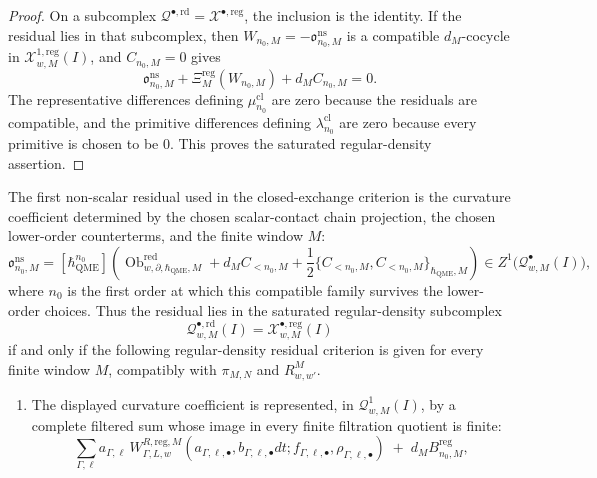 \begin{proof}
  On a subcomplex
  \(\mathcal Q^{\bullet,\mathrm{rd}}=\mathcal X^{\bullet,\mathrm{reg}}\),
  the inclusion is the identity.  If the residual lies in that subcomplex,
  then
  \(W_{n_0,M}=-\mathfrak o^{\mathrm{ns}}_{n_0,M}\) is a compatible
  \(d_M\)-cocycle in
  \(\mathcal X^{1,\mathrm{reg}}_{w,M}(I)\), and \(C_{n_0,M}=0\) gives
  \[
    \mathfrak o^{\mathrm{ns}}_{n_0,M}
      +\Xi^{\mathrm{reg}}_M(W_{n_0,M})
      +d_MC_{n_0,M}=0.
  \]
  The representative differences defining
  \(\mu^{\mathrm{cl}}_{n_0}\) are zero because the residuals are
  compatible, and the primitive differences defining
  \(\lambda^{\mathrm{cl}}_{n_0}\) are zero because every primitive is
  chosen to be \(0\).  This proves the saturated regular-density assertion.
\end{proof}

\begin{prop}
\label{prop:wt-first-regular-density-residual-criterion}
  The first non-scalar residual used in the closed-exchange criterion is
  the curvature coefficient determined by the chosen scalar-contact chain
  projection, the chosen lower-order counterterms, and the finite window
  \(M\):
  \[
    \mathfrak o^{\mathrm{ns}}_{n_0,M}
      =
      [\hbar_{\mathrm{QME}}^{n_0}]\left(
        \operatorname{Ob}^{\mathrm{red}}_{w,\partial,\hbar_{\mathrm{QME}},M}
        +d_MC_{<n_0,M}
        +\frac12\{C_{<n_0,M},C_{<n_0,M}\}_{\hbar_{\mathrm{QME}},M}
      \right)
      \in Z^1\bigl(\mathcal Q^\bullet_{w,M}(I)\bigr),
  \]
  where \(n_0\) is the first order at which this compatible family
  survives the lower-order choices.  Thus the residual lies in the
  saturated regular-density subcomplex
  \[
    \mathcal Q^{\bullet,\mathrm{rd}}_{w,M}(I)
      =
    \mathcal X^{\bullet,\mathrm{reg}}_{w,M}(I)
  \]
  if and only if the following regular-density residual criterion is
  given for every finite window \(M\), compatibly with \(\pi_{M,N}\) and
  \(R^M_{w,w'}\).
  \begin{enumerate}[label=(R\arabic*)]
    \item The displayed curvature coefficient is represented, in
      \(\mathcal Q^1_{w,M}(I)\), by a complete filtered sum whose image in
      every finite filtration quotient is finite:
      \[
        \sum_{\Gamma,\ell}
          a_{\Gamma,\ell}\,
          W^{R,\mathrm{reg},M}_{\Gamma,L,w}
          (a_{\Gamma,\ell,\bullet},
           b_{\Gamma,\ell,\bullet}dt;
           f_{\Gamma,\ell,\bullet},
           \rho_{\Gamma,\ell,\bullet})
        \;+\; d_M B^{\mathrm{reg}}_{n_0,M},
\]
\end{enumerate}
\end{prop}
